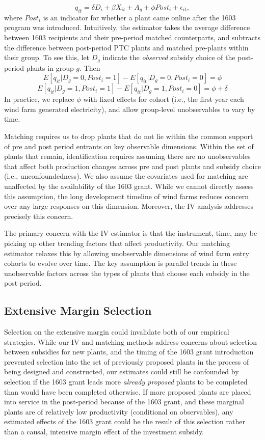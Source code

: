 \documentclass[12pt]{article}
\begin{document}
\begin{equation}
q_{it}=\delta D_{i}+\beta X_{it}+A_{g}+\phi Post_{i}+\epsilon_{it}\label{eq:mdd} ,
\end{equation}
where $Post_{i}$ is an indicator for whether a plant came online after the 1603 program was introduced. Intuitively, the estimator takes the average difference between 1603 recipients and their pre-period matched counterparts, and subtracts the difference between post-period PTC plants and matched pre-plants within their group. To see this, let $D_{g}$ indicate the \emph{observed} subsidy choice of the post-period plants in group $g$. Then
\[
E[q_{it}|D_{g}=0,Post_{i}=1]-E[q_{it}|D_{g}=0,Post_{i}=0]=\phi
\]
\[
E[q_{it}|D_{g}=1,Post_{i}=1]-E[q_{it}|D_{g}=1,Post_{i}=0]=\phi+\delta
\]
In practice, we replace $\phi$ with fixed effects for cohort (i.e., the first year each wind farm generated electricity), and allow group-level unobservables to vary by time.

Matching requires us to drop plants that do not lie within the common support of pre and post period entrants on key observable dimensions. Within the set of plants that remain, identification requires assuming there are no unobservables that affect both production changes across pre and post plants and subsidy choice (i.e., unconfoundedness). We also assume the covariates used for matching are unaffected by the availability of the 1603 grant. While we cannot directly assess this assumption, the long development timeline of wind farms reduces concern over any large responses on this dimension. Moreover, the IV analysis addresses precisely this concern.

The primary concern with the IV estimator is that the instrument, time, may be picking up other trending factors that affect productivity. Our matching estimator relaxes this by allowing unobservable dimensions of wind farm entry cohorts to evolve over time. The key assumption is parallel trends in these unobservable factors across the types of plants that choose each subsidy in the post period. 

\subsection{Extensive Margin Selection \label{subsec:EntrySelection}}

Selection on the extensive margin could invalidate both of our empirical strategies. While our IV and matching methods address concerns about selection between subsidies for new plants, and the timing of the 1603 grant introduction prevented selection into the set of previously proposed plants in the process of being designed and constructed, our estimates could still be confounded by selection if the 1603 grant leads more \textit{already proposed} plants to be completed than would have been completed otherwise. If more proposed plants are placed into service in the post-period because of the 1603 grant, and these marginal plants are of relatively low productivity (conditional on observables), any estimated effects of the 1603 grant could be the result of this selection rather than a causal, intensive margin effect of the investment subsidy.
\end{document}
